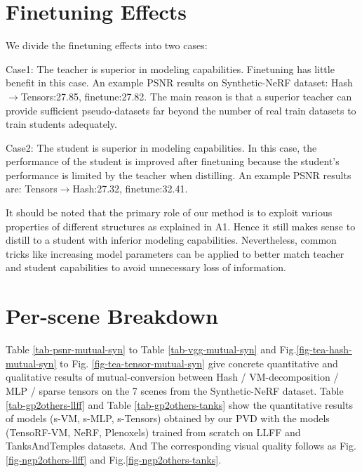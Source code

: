 \documentclass[letterpaper]{article} \usepackage{aaai23}  \usepackage{times}  \usepackage{helvet}  \usepackage{courier}  \usepackage[hyphens]{url}  \usepackage{graphicx} \urlstyle{rm} \def\UrlFont{\rm}  \usepackage{natbib}  \usepackage{caption} \frenchspacing  \setlength{\pdfpagewidth}{8.5in}  \setlength{\pdfpageheight}{11in}  \usepackage{multirow}
\begin{document}
\section{Finetuning Effects}
We divide the finetuning effects into two cases:

Case1: The teacher is superior in modeling capabilities.
Finetuning has little benefit in this case. An example PSNR results on Synthetic-NeRF dataset: Hash$\to $Tensors:27.85, finetune:27.82. The main reason is that a superior teacher can provide sufficient pseudo-datasets far beyond the number of real train datasets to train students adequately.

Case2: The student is superior in modeling capabilities.
In this case, the performance of the student is improved after finetuning because the student's performance is limited by the teacher when distilling. An example PSNR results are: Tensors$\to$Hash:27.32, finetune:32.41.

It should be noted that the primary role of our method is to exploit various properties of different structures as explained in A1. Hence it still makes sense to distill to a student with inferior modeling capabilities. Nevertheless, common tricks like increasing model parameters can be applied to better match teacher and student capabilities to avoid unnecessary loss of information.

\section{Per-scene Breakdown}
Table \ref{tab-psnr-mutual-syn} to  Table \ref{tab-vgg-mutual-syn} and Fig.\ref{fig-tea-hash-mutual-syn} to Fig. \ref{fig-tea-tensor-mutual-syn} give concrete quantitative and qualitative results of mutual-conversion between Hash / VM-decomposition / MLP / sparse tensors on the 7 scenes from the Synthetic-NeRF dataset.
Table \ref{tab-gp2others-llff} and Table \ref{tab-gp2others-tanks} show the quantitative results of models (s-VM, s-MLP, s-Tensors) obtained by our PVD with the models (TensoRF-VM, NeRF, Plenoxels) trained from scratch on LLFF and TanksAndTemples datasets. And The corresponding visual quality follows as Fig.\ref{fig-ngp2others-llff} and Fig.\ref{fig-ngp2others-tanks}.
\end{document}
